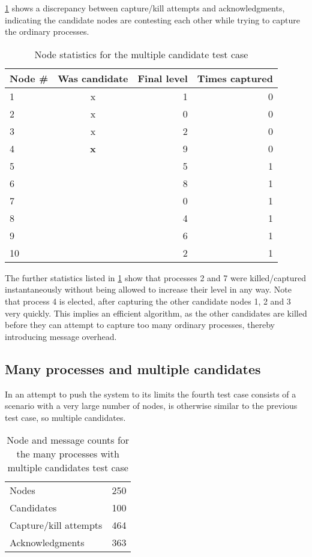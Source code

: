 \documentclass{article}
\begin{document}
\cref{tab:stats-multiple} shows a discrepancy between capture/kill attempts and acknowledgments, indicating the candidate nodes are contesting each other while trying to capture the ordinary processes.

\begin{table}[H]
	\centering
	\caption{Node statistics for the multiple candidate test case}
	\begin{tabular}{l c r r}
		\toprule
		Node \#	& Was candidate	& Final level 	& Times captured	\\
		\midrule
		1		& x				& 1				& 0					\\
		2		& x				& 0				& 0					\\
		3		& x				& 2				& 0					\\
		4		& \textbf{x}	& 9				& 0					\\
		5		& 				& 5				& 1					\\
		6		& 				& 8				& 1					\\
		7		& 				& 0				& 1					\\
		8		& 				& 4				& 1					\\
		9		& 				& 6				& 1					\\
		10		& 				& 2				& 1					\\
		\bottomrule
	\end{tabular}
	\label{tab:stats-multiple}
\end{table}

The further statistics listed in \cref{tab:stats-multiple} show that processes 2 and 7 were killed/captured instantaneously without being allowed to increase their level in any way. Note that process 4 is elected, after capturing the other candidate nodes 1, 2 and 3 very quickly. This implies an efficient algorithm, as the other candidates are killed before they can attempt to capture too many ordinary processes, thereby introducing message overhead.

\subsection{Many processes and multiple candidates}
In an attempt to push the system to its limits the fourth test case consists of a scenario with a very large number of nodes, is otherwise similar to the previous test case, so multiple candidates.

\begin{table}[H]
	\centering
	\caption{Node and message counts for the many processes with multiple candidates test case}
	\begin{tabular}{l r}
		\toprule
		Nodes 					& 250	\\
		Candidates 				& 100 	\\
		Capture/kill attempts 	& 464	\\
		Acknowledgments 		& 363	\\
		\bottomrule
	\end{tabular}
	\label{tab:counts-many}
\end{table}
\end{document}
